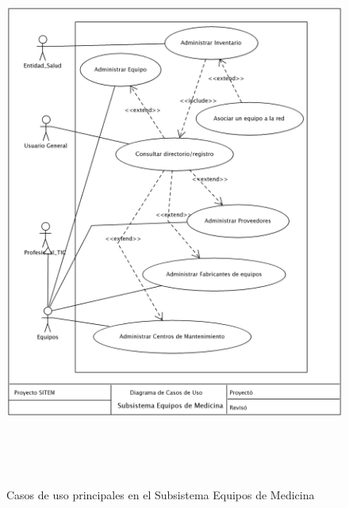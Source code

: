 \begin{figure}
 \centering
 \includegraphics[width=156mm, height=182mm]{casos_equipos.png}
 \caption{Casos de uso principales en el Subsistema Equipos de Medicina}
 \label{casos_equipos}
\end{figure}

